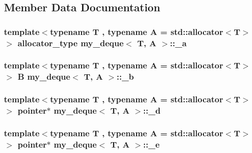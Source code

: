 \subsection{Member Data Documentation}
\hypertarget{classmy__deque_ab2ba2e14114a27b2f91e47dfccabc639}{
\subsubsection[{\-\_\-a}]{\setlength{\rightskip}{0pt plus 5cm}template$<$typename T , typename A  = std\-::allocator$<$\-T$>$$>$ {\bf allocator\-\_\-type} {\bf my\-\_\-deque}$<$ T, A $>$\-::\-\_\-a\hspace{0.3cm}{\ttfamily [private]}}}\label{classmy__deque_ab2ba2e14114a27b2f91e47dfccabc639}
\hypertarget{classmy__deque_a365667310d1858fdfbb4d4e95a98fdf6}{
\subsubsection[{\-\_\-b}]{\setlength{\rightskip}{0pt plus 5cm}template$<$typename T , typename A  = std\-::allocator$<$\-T$>$$>$ {\bf B} {\bf my\-\_\-deque}$<$ T, A $>$\-::\-\_\-b\hspace{0.3cm}{\ttfamily [private]}}}\label{classmy__deque_a365667310d1858fdfbb4d4e95a98fdf6}
\hypertarget{classmy__deque_a4dcfc8cca4d49800ae5dfec5d5dfec6c}{
\subsubsection[{\-\_\-d}]{\setlength{\rightskip}{0pt plus 5cm}template$<$typename T , typename A  = std\-::allocator$<$\-T$>$$>$ {\bf pointer}$\ast$ {\bf my\-\_\-deque}$<$ T, A $>$\-::\-\_\-d\hspace{0.3cm}{\ttfamily [private]}}}\label{classmy__deque_a4dcfc8cca4d49800ae5dfec5d5dfec6c}
\hypertarget{classmy__deque_aa2382314564214ae5f83365c22bbf43d}{
\subsubsection[{\-\_\-e}]{\setlength{\rightskip}{0pt plus 5cm}template$<$typename T , typename A  = std\-::allocator$<$\-T$>$$>$ {\bf pointer}$\ast$ {\bf my\-\_\-deque}$<$ T, A $>$\-::\-\_\-e\hspace{0.3cm}{\ttfamily [private]}}}\label{classmy__deque_aa2382314564214ae5f83365c22bbf43d}
